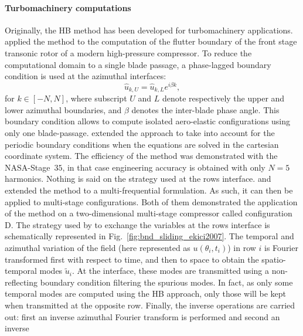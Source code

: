\paragraph{Turbomachinery computations}
Originally, the HB method has been developed for 
turbomachinery applications.
\citet{Hall2002} applied the method to the computation
of the flutter boundary of the front stage transonic rotor 
of a modern high-pressure compressor. To reduce the
computational domain to a single blade passage, 
a phase-lagged boundary condition is used at the azimuthal
interfaces:
\begin{equation}
	\widehat{u}_{k, U} = \widehat{u}_{k, L} e^{i \beta k},
\end{equation}
for $k \in [-N, N]$, where subscript $U$ and $L$ denote
respectively the upper and lower azimuthal boundaries, and
$\beta$ denotes the inter-blade phase angle. This boundary
condition allows to compute isolated aero-elastic configurations
using only one blade-passage.
 extended the approach to take into account
for the periodic boundary conditions when the equations are solved in the
cartesian coordinate system. The efficiency of the
method was demonstrated with the NASA-Stage~$35$, in that case
engineering accuracy is obtained with only $N=5$ harmonics.
Nothing is said on the strategy used at the rows interface.
\citet{Ekici2007} and \citet{Gopinath2007}
extended the method to a multi-frequential formulation. 
As such, it can then be applied to multi-stage
configurations. Both of them demonstrated the application of
the method on
a two-dimensional multi-stage compressor called
configuration D. 
The strategy used by \citet{Ekici2007} 
to exchange the variables at
the rows interface is schematically represented 
in Fig.~\ref{fig:bnd_sliding_ekici2007}.
The temporal and azimuthal variation 
of the field (here represented as $u (\theta_i, t_i)$)
in row $i$ is Fourier transformed first with
respect to time, and then
to space to obtain the spatio-temporal modes $\widetilde{u}_i$.
At the interface, these modes are transmitted using a non-reflecting
boundary condition filtering the spurious modes. In fact, as only some
temporal modes are computed using the HB approach, only
those will be kept when transmitted at the opposite row.
Finally, the inverse operations are carried out: first an inverse
azimuthal Fourier transform is performed and second an inverse
